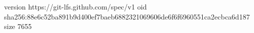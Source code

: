 version https://git-lfs.github.com/spec/v1
oid sha256:88e6c52ba891b9d400ef7baeb6882321069606de6f6f6960551ca2ecbca6d187
size 7655
